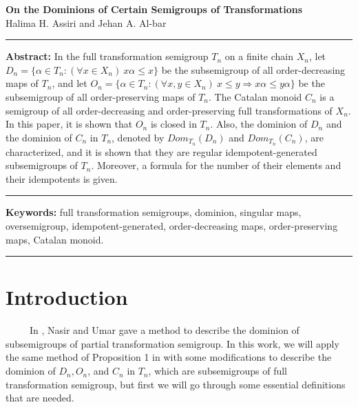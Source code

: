 \documentclass[10pt]{extarticle}
\numberwithin{equation}{section}
\numberwithin{bbb}{section}
\numberwithin{equation}{section}
\begin{document}
\begin{center}
{\LARGE\textbf{On the Dominions of Certain Semigroups of Transformations}}\\
\vspace{0.5cm}
\large {Halima H. Assiri and Jehan A. Al-bar}
\end{center}

\vspace{0.5cm}
\hrule
\vspace{0.6cm}
\textbf{Abstract:} In the full transformation semigroup $T_n$ on a finite chain $X_n$, let $D_n=\{\alpha \in T_n:(\forall x \in X_n) \ x\alpha \le x\}$ be the subsemigroup of all order-decreasing maps of $T_n$, and let $O_n=\{\alpha \in T_n:(\forall x ,y\in X_n) \ x \le y \Rightarrow x\alpha \leq y\alpha\}$ be the subsemigroup of all order-preserving maps of $T_n$. The Catalan monoid $C_n$ is a semigroup of all order-decreasing and order-preserving full transformations of $X_n$. In this paper, it is shown that $O_n$ is closed in $T_n$. Also, the dominion of $D_n$ and the dominion of $C_n$ in $T_n$, denoted by $Dom_{T_n}(D_n)$ and $Dom_{T_n}(C_n)$, are characterized, and it is shown that they are regular idempotent-generated subsemigroups of $T_n$. Moreover, a formula for the number of their elements and their idempotents is given.

\vspace{0.3cm}
\hrule
\vspace{0.6cm}
\textbf{Keywords:} full transformation semigroups, dominion, singular maps, oversemigroup, idempotent-generated, order-decreasing maps, order-preserving maps, Catalan monoid.

\vspace{0.4cm}
\hrule
\vspace{0.5cm}

\section{Introduction}
\ \ \ \ \ In \cite{7}, Nasir and Umar gave a method to describe the dominion of subsemigroups of partial transformation semigroup. In this work, we will apply the same method of Proposition 1 in \cite{7} with some modifications to describe the dominion of $D_n, O_n$, and $C_n$ in $T_n$, which are subsemigroups of full transformation semigroup, but first we will go through some essential definitions that are needed.
\end{document}
